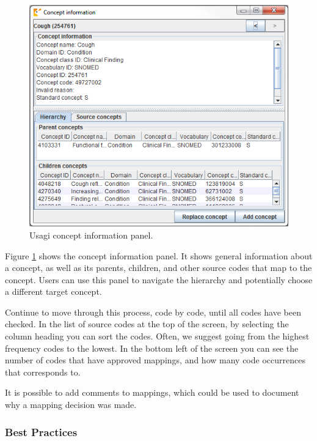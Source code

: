 \documentclass[11pt]{book}
\theoremstyle{definition}
\theoremstyle{definition}
\theoremstyle{definition}
\theoremstyle{remark}
\begin{document}
\begin{figure}
\includegraphics[width=1\linewidth]{images/ExtractTransformLoad/usagiConceptInfo} \caption{Usagi concept information panel.}\label{fig:usagiConceptInfo}
\end{figure}

Figure \ref{fig:usagiConceptInfo} shows the concept information panel. It shows general information about a concept, as well as its parents, children, and other source codes that map to the concept. Users can use this panel to navigate the hierarchy and potentially choose a different target concept.

Continue to move through this process, code by code, until all codes have been checked. In the list of source codes at the top of the screen, by selecting the column heading you can sort the codes. Often, we suggest going from the highest frequency codes to the lowest. In the bottom left of the screen you can see the number of codes that have approved mappings, and how many code occurrences that corresponds to.

It is possible to add comments to mappings, which could be used to document why a mapping decision was made.

\hypertarget{best-practices}{%
\subsubsection*{Best Practices}\label{best-practices}}
\end{document}
